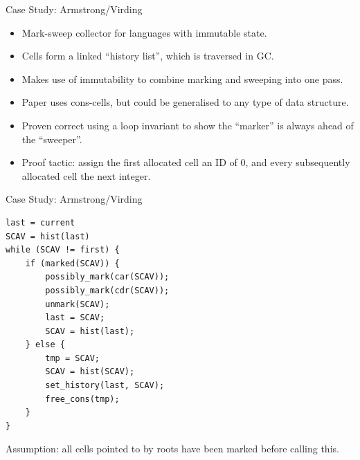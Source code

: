 \documentclass[usenames,dvipsnames]{beamer}
\begin{document}
\begin{frame}[fragile]{Case Study: Armstrong/Virding}
  \begin{itemize}
  \item Mark-sweep collector for languages with immutable state.
  \item Cells form a linked ``history list'', which is traversed in
    GC.
  \item Makes use of immutability to combine marking and sweeping
    into one pass.
  \item Paper uses cons-cells, but could be generalised to any type
    of data structure.
  \item Proven correct using a loop invariant to show the ``marker''
    is always ahead of the ``sweeper''.
  \item Proof tactic: assign the first allocated cell an ID of 0, and
    every subsequently allocated cell the next integer.
  \end{itemize}



\end{frame}

\begin{frame}[fragile]{Case Study: Armstrong/Virding}
  \begin{lstlisting}
last = current
SCAV = hist(last)
while (SCAV != first) {
    if (marked(SCAV)) {
        possibly_mark(car(SCAV));
        possibly_mark(cdr(SCAV));
        unmark(SCAV);
        last = SCAV;
        SCAV = hist(last);
    } else {
        tmp = SCAV;
        SCAV = hist(SCAV);
        set_history(last, SCAV);
        free_cons(tmp);
    }
}
  \end{lstlisting}

  Assumption: all cells pointed to by roots have been marked before
  calling this.


\end{frame}
\end{document}
